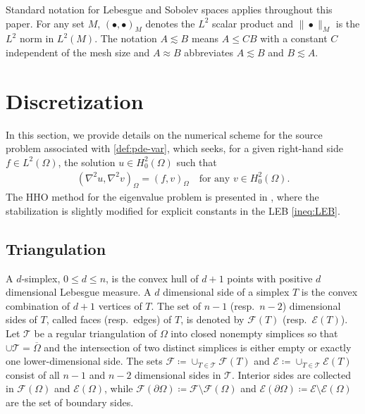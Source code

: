 \documentclass[a4paper]{amsart}
\numberwithin{equation}{section}
\theoremstyle{definition}
\theoremstyle{remark}
\numberwithin{theorem}{section}
\numberwithin{equation}{section}
\numberwithin{table}{section}
\numberwithin{figure}{section}
\begin{document}
Standard notation for Lebesgue and Sobolev spaces applies throughout this paper.
For any set $M$, $(\bullet, \bullet)_M$ denotes the $L^2$ scalar product and $\|\bullet\|_M$ is the $L^2$ norm in $L^2(M)$. The notation $A \lesssim B$ means $A \leq CB$ with a constant $C$ independent of the mesh size and $A \approx B$ abbreviates $A \lesssim B$ and $B \lesssim A$. 

\section{Discretization}\label{sec:discretization}

In this section, we provide details on the numerical scheme for the source problem associated with \eqref{def:pde-var}, which seeks, for a given right-hand side $f \in L^2(\Omega)$, the solution $u \in H^2_0(\Omega)$ such that
\begin{align}\label{def:source-problem}
    (\nabla^2 u, \nabla^2 v)_{\Omega} = (f,v)_{\Omega} \quad\text{for any } v \in H^2_0(\Omega).
\end{align}
The HHO method for the eigenvalue problem is presented in , where the stabilization is slightly modified for explicit constants in the LEB \eqref{ineq:LEB}.

\subsection{Triangulation}
A $d$-simplex, $0 \leq d \leq n$, is the convex hull of $d+1$ points with positive $d$ dimensional Lebesgue measure.
A $d$ dimensional side of a simplex $T$ is the convex combination of $d+1$ vertices of $T$.
The set of $n-1$ (resp.~$n-2$) dimensional sides of $T$, called faces (resp.~edges) of $T$, is denoted by $\mathcal{F}(T)$ (resp.~$\mathcal{E}(T)$).
Let $\mathcal{T}$ be a regular triangulation of $\Omega$ into closed nonempty simplices so that $\cup \mathcal{T} = \overline{\Omega}$ and the intersection of two distinct simplices is either empty or exactly one lower-dimensional side.
The sets $\mathcal{F} \coloneqq \cup_{T \in \mathcal{T}} \mathcal{F}(T)$ and $\mathcal{E} \coloneqq \cup_{T \in \mathcal{T}} \mathcal{E}(T)$ consist of all $n-1$ and $n-2$ dimensional sides in $\mathcal{T}$.
Interior sides are collected in $\mathcal{F}(\Omega)$ and $\mathcal{E}(\Omega)$, while $\mathcal{F}(\partial \Omega) \coloneqq \mathcal{F}\setminus\mathcal{F}(\Omega)$ and $\mathcal{E}(\partial \Omega) \coloneqq \mathcal{E}\setminus\mathcal{E}(\Omega)$ are the set of boundary sides.
\end{document}
